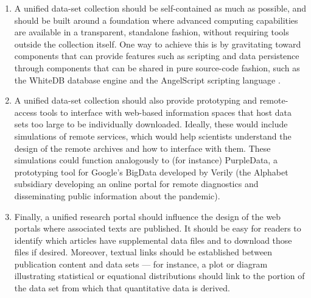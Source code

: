 {\begin{enumerate}[leftmargin=3pt, itemsep=4pt,topsep=11pt]
\item{}  A unified data-set collection should 
be self-contained as much as possible, and should be 
built around a foundation where advanced computing 
capabilities are available in a transparent, 
standalone fashion, without requiring tools 
outside the collection itself.  One way to 
achieve this is by gravitating 
toward components that can provide 
features such as scripting and data persistence 
through components that can be shared 
in pure source-code fashion, 
such as the WhiteDB database engine 
\cite{EnarReilent} and the AngelScript 
scripting language \cite{AS}.   

\item{}  A unified data-set collection should also provide 
prototyping and remote-access tools to interface with 
web-based information spaces that host data sets 
too large to be individually downloaded.  Ideally, 
these would include simulations of remote services, which 
would help scientists understand the design of 
the remote archives and how to interface with them.
These simulations could function analogously to 
(for instance) 
PurpleData, a prototyping tool for Google's BigData 
developed by Verily (the Alphabet subsidiary developing 
an online \Covid{} portal for remote diagnostics 
and disseminating public information about the pandemic). 

\item{}  Finally, a unified research portal should  
influence the design of the web portals where associated 
texts are published.  It should be easy for readers to 
identify which articles have supplemental data files and 
to download those files if desired.  Moreover, 
textual links should be established between publication 
content and data sets --- for instance, a plot or 
diagram illustrating statistical or equational distributions 
should link to the portion of the data set from which that 
quantitative data is derived.
\end{enumerate}}


